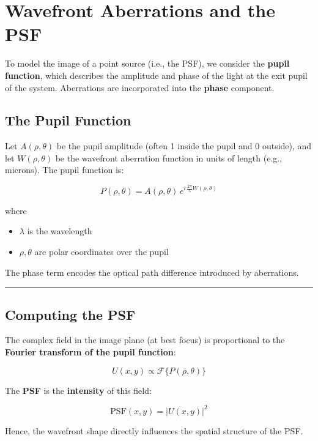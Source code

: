 \documentclass[
  letterpaper,
]{book}
\providecommand{\tightlist}{%
  \setlength{\itemsep}{0pt}\setlength{\parskip}{0pt}}\usepackage{longtable,booktabs,array}
\begin{document}
\section{Wavefront Aberrations and the
PSF}\label{sec-optics-psf-wavefront}

To model the image of a point source (i.e., the PSF), we consider the
\textbf{pupil function}, which describes the amplitude and phase of the
light at the exit pupil of the system. Aberrations are incorporated into
the \textbf{phase} component.

\subsection{The Pupil Function}\label{the-pupil-function}

Let \(A(\rho, \theta)\) be the pupil amplitude (often 1 inside the pupil
and 0 outside), and let \(W(\rho, \theta)\) be the wavefront aberration
function in units of length (e.g., microns). The pupil function is:

\[
P(\rho, \theta) = A(\rho, \theta) \, e^{i \, \frac{2\pi}{\lambda} W(\rho, \theta)}
\]

where

\begin{itemize}
\tightlist
\item
  \(\lambda\) is the wavelength
\item
  \(\rho, \theta\) are polar coordinates over the pupil
\end{itemize}

The phase term encodes the optical path difference introduced by
aberrations.

\begin{center}\rule{0.5\linewidth}{0.5pt}\end{center}

\subsection{Computing the PSF}\label{computing-the-psf}

The complex field in the image plane (at best focus) is proportional to
the \textbf{Fourier transform of the pupil function}:

\[
U(x, y) \propto \mathcal{F}\{ P(\rho, \theta) \}
\]

The \textbf{PSF} is the \textbf{intensity} of this field:

\[
\text{PSF}(x, y) = |U(x, y)|^2
\]

Hence, the wavefront shape directly influences the spatial structure of
the PSF.
\end{document}
